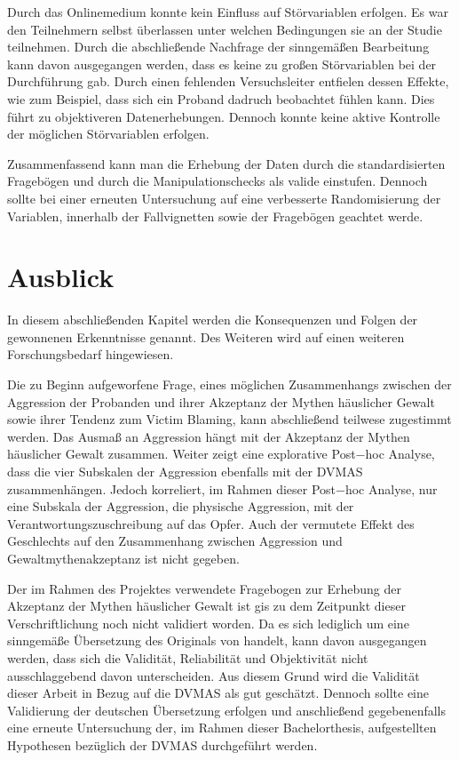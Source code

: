 Durch das Onlinemedium konnte kein Einfluss auf Störvariablen erfolgen. Es war den Teilnehmern selbst überlassen unter welchen Bedingungen sie an der Studie teilnehmen. Durch die abschließende Nachfrage der sinngemäßen Bearbeitung kann davon ausgegangen werden, dass es keine zu großen Störvariablen bei der Durchführung gab. Durch einen fehlenden Versuchsleiter entfielen dessen Effekte, wie zum Beispiel, dass sich ein Proband dadruch beobachtet fühlen kann. Dies führt zu objektiveren Datenerhebungen. Dennoch konnte keine aktive Kontrolle der möglichen Störvariablen erfolgen.

Zusammenfassend kann man die Erhebung der Daten durch die standardisierten Fragebögen und durch die Manipulationschecks als valide einstufen. Dennoch sollte bei einer erneuten Untersuchung auf eine verbesserte Randomisierung der Variablen, innerhalb der Fallvignetten sowie der Fragebögen geachtet werde. 


\section{Ausblick}    \label{sec_5.4}
In diesem abschließenden Kapitel werden die Konsequenzen und Folgen der gewonnenen Erkenntnisse genannt. Des Weiteren wird auf einen weiteren Forschungsbedarf hingewiesen.

Die zu Beginn aufgeworfene Frage, eines möglichen Zusammenhangs zwischen der Aggression der Probanden und ihrer Akzeptanz der Mythen häuslicher Gewalt sowie ihrer Tendenz zum Victim Blaming, kann abschließend teilwese zugestimmt werden. Das Ausmaß an Aggression hängt mit der Akzeptanz der Mythen häuslicher Gewalt zusammen. Weiter zeigt eine explorative Post$-$hoc Analyse, dass die vier Subskalen der Aggression ebenfalls mit der DVMAS zusammenhängen. Jedoch korreliert, im Rahmen dieser Post$-$hoc Analyse, nur eine Subskala der Aggression, die physische Aggression, mit der Verantwortungszuschreibung auf das Opfer. Auch der vermutete Effekt des Geschlechts auf den Zusammenhang zwischen Aggression und Gewaltmythenakzeptanz ist nicht gegeben. 

Der im Rahmen des Projektes verwendete Fragebogen zur Erhebung der Akzeptanz der Mythen häuslicher Gewalt ist gis zu dem Zeitpunkt dieser Verschriftlichung noch nicht validiert worden. Da es sich lediglich um eine sinngemäße Übersetzung des Originals von \textcite{Peters2003} handelt, kann davon ausgegangen werden, dass sich die Validität, Reliabilität und Objektivität nicht ausschlaggebend davon unterscheiden. Aus diesem Grund wird die Validität dieser Arbeit in Bezug auf die DVMAS als gut geschätzt. Dennoch sollte eine Validierung der deutschen Übersetzung erfolgen und anschließend gegebenenfalls eine erneute Untersuchung der, im Rahmen dieser Bachelorthesis, aufgestellten Hypothesen bezüglich der DVMAS durchgeführt werden. 


